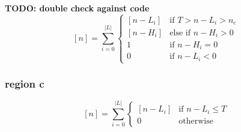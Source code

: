 \documentclass[a4paper, 11pt]{article}
\begin{document}
\textbf{TODO: double check against code}
\[
	[n] = \sum_{i=0}^{\vert L \vert}
		\begin{cases}
			[n - L_i]	& \text{if $T > n - L_i > n_c$} \\
			[n - H_i]	& \text{else if $n - H_i > 0$} \\
			1		& \text{if $n - H_i = 0$} \\
			0		& \text{if $n - L_i < 0$}
		 \end{cases}
\]

\subsubsection{region c}

\[
	[n] = \sum_{i=0}^{\vert L \vert}
		\begin{cases}
			[n - L_i]	& \text{if $n - L_i \leq T$} \\
			0		& \text{otherwise}
			
		 \end{cases}
\]
\end{document}
